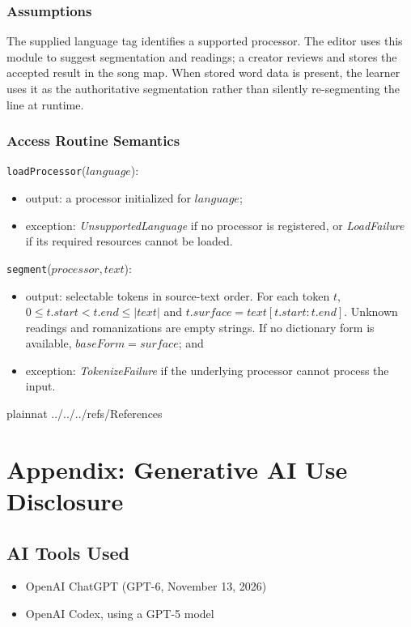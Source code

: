 \documentclass[12pt, titlepage]{article}
\begin{document}
\subsubsection{Assumptions}

The supplied language tag identifies a supported processor.  The editor uses
this module to suggest segmentation and readings; a creator reviews and stores
the accepted result in the song map.  When stored word data is present, the
learner uses it as the authoritative segmentation rather than silently
re-segmenting the line at runtime.

\subsubsection{Access Routine Semantics}

\noindent \texttt{loadProcessor}($language$):
\begin{itemize}
  \item output: a processor initialized for $language$;
  \item exception: \textit{UnsupportedLanguage} if no processor is registered,
  or \textit{LoadFailure} if its required resources cannot be loaded.
\end{itemize}

\noindent \texttt{segment}($processor,text$):
\begin{itemize}
  \item output: selectable tokens in source-text order.  For each token $t$,
  $0 \leq t.start < t.end \leq |text|$ and
  $t.surface=text[t.start:t.end]$.  Unknown readings and romanizations are
  empty strings.  If no dictionary form is available, $baseForm=surface$; and
  \item exception: \textit{TokenizeFailure} if the underlying processor
  cannot process the input.
\end{itemize}

\newpage

 {plainnat}
 {../../../refs/References}

\newpage

\newpage{}

\section{Appendix: Generative AI Use Disclosure}
\label{SecMISDisclosure}

\subsection{AI Tools Used}
\begin{itemize}
  \item OpenAI ChatGPT (GPT-6, November 13, 2026)
  \item OpenAI Codex, using a GPT-5 model
\end{itemize}
\end{document}
